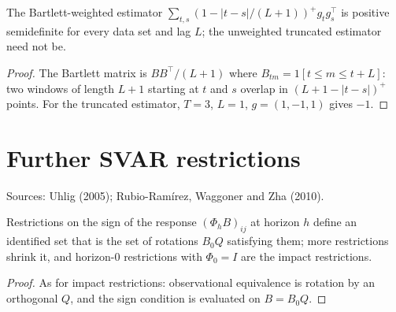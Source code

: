 \begin{theorem}
\label{thm:newey-west}
\leanok
The Bartlett-weighted estimator $\sum_{t,s}(1-|t-s|/(L+1))^+ g_tg_s^\top$ is positive semidefinite for every data set
and lag $L$; the unweighted truncated estimator need not be.
\end{theorem}
\begin{proof}
\leanok
The Bartlett matrix is $BB^\top/(L+1)$ where $B_{tm} = 1[t\le m\le t+L]$: two windows of length $L+1$ starting at $t$
and $s$ overlap in $(L+1-|t-s|)^+$ points. For the truncated estimator, $T = 3$, $L = 1$, $g = (1,-1,1)$ gives $-1$.
\end{proof}

\section{Further SVAR restrictions}
\label{sec:svar-more}

Sources: Uhlig (2005); Rubio-Ram\'irez, Waggoner and Zha (2010).

\begin{theorem}
\label{thm:sign-horizon}
\leanok
{}
Restrictions on the sign of the response $(\Phi_hB)_{ij}$ at horizon $h$ define an identified set that is the set of
rotations $B_0Q$ satisfying them; more restrictions shrink it, and horizon-0 restrictions with $\Phi_0 = I$ are the
impact restrictions.
\end{theorem}
\begin{proof}
\leanok
As for impact restrictions: observational equivalence is rotation by an orthogonal $Q$, and the sign condition is
evaluated on $B = B_0Q$.
\end{proof}

